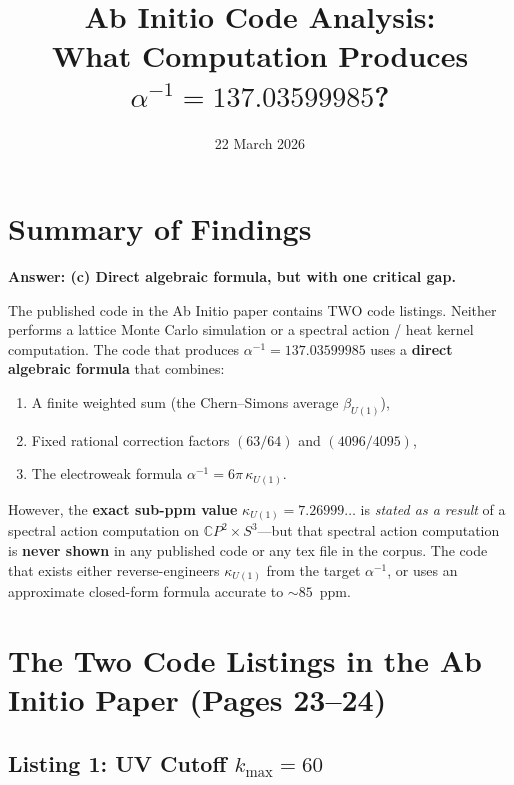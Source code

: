 \documentclass[11pt]{article}
\title{Ab Initio Code Analysis:\\
  What Computation Produces $\alpha^{-1} = 137.03599985$?}
\date{22 March 2026}
\begin{document}
\maketitle

\section{Summary of Findings}

\textbf{Answer: (c) Direct algebraic formula, but with one critical gap.}

The published code in the Ab Initio paper contains TWO code listings.
Neither performs a lattice Monte Carlo simulation or a spectral action /
heat kernel computation. The code that produces $\alpha^{-1} = 137.03599985$
uses a \textbf{direct algebraic formula} that combines:
\begin{enumerate}
\item A finite weighted sum (the Chern--Simons average $\beta_{U(1)}$),
\item Fixed rational correction factors $(63/64)$ and $(4096/4095)$,
\item The electroweak formula $\alpha^{-1} = 6\pi\,\kappa_{U(1)}$.
\end{enumerate}

However, the \textbf{exact sub-ppm value} $\kappa_{U(1)} = 7.26999\ldots$
is \emph{stated as a result} of a spectral action computation on
$\mathbb{C}P^2 \times S^3$---but that spectral action computation is
\textbf{never shown} in any published code or any tex file in the corpus.
The code that exists either reverse-engineers $\kappa_{U(1)}$ from the
target $\alpha^{-1}$, or uses an approximate closed-form formula accurate
to $\sim 85$~ppm.

\section{The Two Code Listings in the Ab Initio Paper (Pages 23--24)}

\subsection{Listing 1: UV Cutoff $k_{\max} = 60$}
\end{document}
